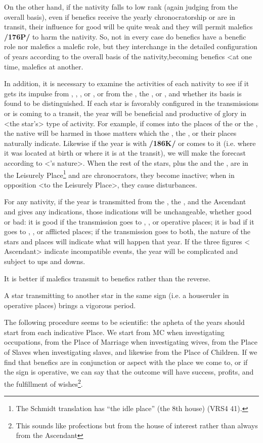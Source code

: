 On the other hand, if the nativity falls to low rank (again judging from the overall basis), even if benefics receive the yearly chronocratorship or are in transit, their influence for good will be quite weak and they will permit malefics \textbf{/176P/} to harm the nativity. \mnbm So, not in every case do benefics have a benefic role nor  malefics a malefic role, but they \mnmb interchange in the detailed configuration of years according to the overall basis of the nativity,becoming benefics <at one time, malefics at another.

In addition, it is necessary to examine the activities of each nativity to see if it gets its impulse from \Mercury, \Mars, \Venus, or \Saturn, or from the \Sun, the \Moon, or \Jupiter, and whether its basis is found to be distinguished. If each star is favorably configured in the transmissions or is coming to a transit, the year will be beneficial and productive of glory in <the star’s> type of activity. For example, if \Saturn\xspace comes into the places of the \Sun\xspace or the \Moon, the native will be harmed in those matters which the \Sun, the \Moon, or their places naturally indicate. Likewise if the year is with \Saturn\xspace \textbf{/186K/} or comes to it (i.e. where it was located at birth or where it is at the transit), we will make the forecast according to <\Saturn’s
nature>. When the rest of the stars, plus the \Sun\xspace and the \Moon, are in the Leisurely Place\footnote{The Schmidt translation has ``the idle place'' (the 8th house) (VRS4 41).} and are chronocrators, they become inactive; when in opposition <to the Leisurely Place>, they cause disturbances.

For any nativity, if the year is transmitted from the \Sun, the \Moon, and the Ascendant and gives any indications, those indications will be unchangeable, whether good or bad: it is good if the transmission goes to \Venus, \Jupiter, or operative places; it is bad if it goes to \Saturn, \Mars, or afflicted places; if the transmission goes to both, the nature of the stars and places will indicate what will happen that year. If the three figures <\Sun\xspace \Moon\xspace Ascendant> indicate incompatible events, the year will be complicated and
subject to ups and downs. 

It is better if malefics transmit to benefics rather than the reverse. 

A star transmitting to another star in the same sign (i.e. a houseruler in operative places) brings a vigorous period.

The following procedure seems to be scientific: the apheta of the years should start from each indicative Place. We start from MC when investigating occupations, from the Place of Marriage when investigating wives, from the Place of Slaves when investigating slaves, and likewise from the Place of Children. If we find that benefics are in conjunction or aspect with the place we come to, or if the sign is operative, we can
say that the outcome will have success, profits, and the fulfillment of wishes\footnote{This sounds like profections but from the house of interest rather than always from the Ascendant}.

